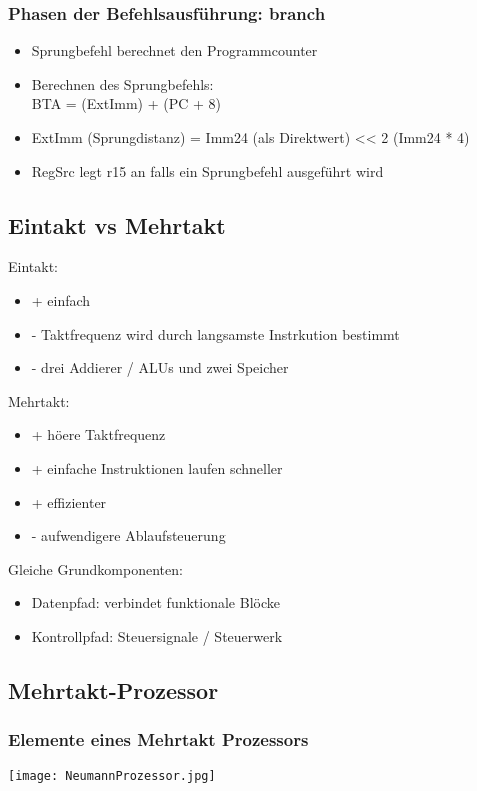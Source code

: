 		\subsubsection{Phasen der Befehlsausführung: branch}
			\begin{itemize}
				\item Sprungbefehl berechnet den Programmcounter
				\item Berechnen des Sprungbefehls: \\
					BTA = (ExtImm) + (PC + 8) 
				\item ExtImm (Sprungdistanz) = Imm24 (als Direktwert) << 2 (Imm24 * 4)
				\item RegSrc legt r15 an falls ein Sprungbefehl ausgeführt wird
			\end{itemize}

			
	\vspace{0.8cm}
	\subsection{Eintakt vs Mehrtakt}
		Eintakt:
		\begin{itemize}
			\item + einfach
			\item - Taktfrequenz wird durch langsamste Instrkution bestimmt
			\item - drei Addierer / ALUs und zwei Speicher
		\end{itemize}
		Mehrtakt:
		\begin{itemize}
			\item + höere Taktfrequenz
			\item + einfache Instruktionen laufen schneller
			\item + effizienter
			\item - aufwendigere Ablaufsteuerung
		\end{itemize}
		Gleiche Grundkomponenten:
		\begin{itemize}
			\item Datenpfad: verbindet funktionale Blöcke
			\item Kontrollpfad: Steuersignale / Steuerwerk
		\end{itemize}


	\vspace{0.8cm}
	\subsection{Mehrtakt-Prozessor}
		\subsubsection{Elemente eines Mehrtakt Prozessors}
			\centerline{\texttt{[image: NeumannProzessor.jpg]}}

